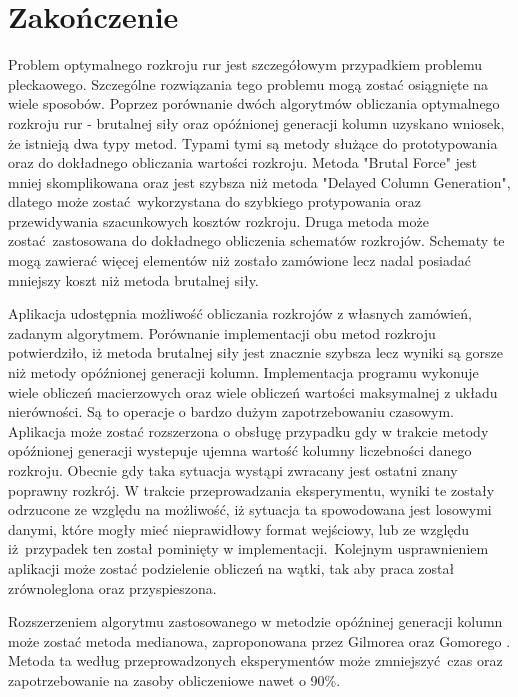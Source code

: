 \section{Zakończenie}
Problem optymalnego rozkroju rur jest szczegółowym przypadkiem problemu pleckaowego. Szczególne rozwiązania tego problemu mogą zostać osiągnięte na wiele sposobów. Poprzez porównanie dwóch algorytmów obliczania optymalnego rozkroju rur - brutalnej siły oraz opóźnionej generacji kolumn uzyskano wniosek, że istnieją dwa typy metod. Typami tymi są metody służące do prototypowania oraz do dokładnego obliczania wartości rozkroju. Metoda "Brutal Force" jest mniej skomplikowana oraz jest szybsza niż metoda "Delayed Column Generation", dlatego może zostać wykorzystana do szybkiego protypowania oraz przewidywania szacunkowych kosztów rozkroju. Druga metoda może zostać zastosowana do dokładnego obliczenia schematów rozkrojów. Schematy te mogą zawierać więcej elementów niż zostało zamówione lecz nadal posiadać mniejszy koszt niż metoda brutalnej siły.

Aplikacja udostępnia możliwość obliczania rozkrojów z własnych zamówień, zadanym algorytmem. Porównanie implementacji obu metod rozkroju potwierdziło, iż metoda brutalnej siły jest znacznie szybsza lecz wyniki są gorsze niż metody opóźnionej generacji kolumn. Implementacja programu wykonuje wiele obliczeń macierzowych oraz wiele obliczeń wartości maksymalnej z układu nierówności. Są to operacje o bardzo dużym zapotrzebowaniu czasowym. Aplikacja może zostać rozszerzona o obsługę przypadku gdy w trakcie metody opóźnionej generacji wystepuje ujemna wartość kolumny liczebności danego rozkroju. Obecnie gdy taka sytuacja wystąpi zwracany jest ostatni znany poprawny rozkrój. W trakcie przeprowadzania eksperymentu, wyniki te zostały odrzucone ze względu na możliwość, iż sytuacja ta spowodowana jest losowymi danymi, które mogły mieć nieprawidłowy format wejściowy, lub ze względu iż przypadek ten został pominięty w implementacji. Kolejnym usprawnieniem aplikacji może zostać podzielenie obliczeń na wątki, tak aby praca został zrównoleglona oraz przyspieszona.

Rozszerzeniem algorytmu zastosowanego w metodzie opóźninej generacji kolumn może zostać metoda medianowa, zaproponowana przez Gilmorea oraz Gomorego \cite{GilmoreGomoryV2Article}. Metoda ta według przeprowadzonych eksperymentów może zmniejszyć czas oraz zapotrzebowanie na zasoby obliczeniowe nawet o 90\%.
